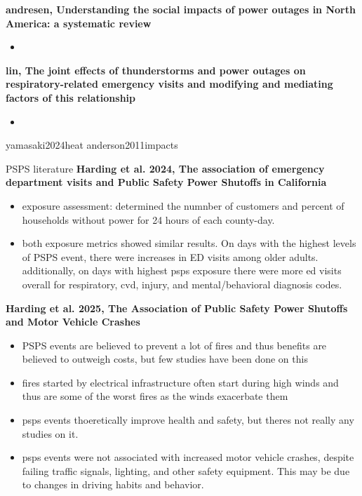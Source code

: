\textbf{andresen, Understanding the social impacts of power outages in North America: a systematic review}
\begin{itemize}
    \item 
\end{itemize}

\textbf{lin, The joint effects of thunderstorms and power outages on respiratory-related emergency visits and modifying and mediating factors of this relationship}
\begin{itemize}
    \item 
\end{itemize}

yamasaki2024heat
anderson2011impacts





PSPS literature
\citep{harding2024association, harding2025a, WONGPARODI2022102495, huang2023review}
\textbf{Harding et al. 2024, The association of emergency department visits and Public Safety Power Shutoffs in California}
\begin{itemize}
    \item exposure assessment: determined the numnber of customers and percent of households without power for 24 hours of each county-day. 
    \item both exposure metrics showed similar results. On days with the highest levels of PSPS event, there were increases in ED visits among older adults. additionally, on days with highest psps exposure there were more ed visits overall for respiratory, cvd, injury, and mental/behavioral diagnosis codes.
\end{itemize}

\textbf{Harding et al. 2025, The Association of Public Safety Power Shutoffs and Motor Vehicle Crashes}
\begin{itemize}
    \item PSPS events are believed to prevent a lot of fires and thus benefits are believed to outweigh costs, but few studies have been done on this 
    \item fires started by electrical infrastructure often start during high winds and thus are some of the worst fires as the winds exacerbate them 
    \item psps events thoeretically improve health and safety, but theres not really any studies on it. 
    \item psps events were not associated with increased motor vehicle crashes, despite failing traffic signals, lighting, and other safety equipment. This may be due to changes in driving habits and behavior. 
\end{itemize}

